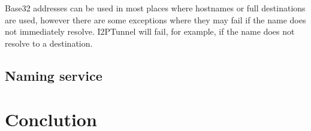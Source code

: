 \documentclass[a4paper,twocolumn,12pt]{article}
\begin{document}
Base32 addresses can be used in most places where hostnames or full destinations are used, however there are some exceptions where they may fail if the name does not immediately resolve. I2PTunnel will fail, for example, if the name does not resolve to a destination.

\subsection{Naming service}


\section{Conclution}




\end{document}
